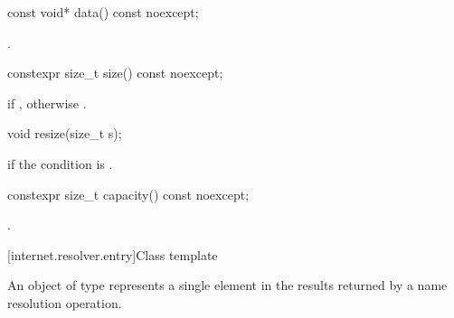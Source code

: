\begin{itemdecl}
const void* data() const noexcept;
\end{itemdecl}

\begin{itemdescr}
\pnum
\returns {}.
\end{itemdescr}

\begin{itemdecl}
constexpr size_t size() const noexcept;
\end{itemdecl}

\begin{itemdescr}
\pnum
\returns {} if , otherwise .
\end{itemdescr}

\begin{itemdecl}
void resize(size_t s);
\end{itemdecl}

\begin{itemdescr}
\pnum
\remarks {} if the condition  \tcode{||}  is .
\end{itemdescr}

\begin{itemdecl}
constexpr size_t capacity() const noexcept;
\end{itemdecl}

\begin{itemdescr}
\pnum
\returns {}.
\end{itemdescr}




%
[internet.resolver.entry]{Class template }

\pnum
An object of type  represents a single element in the results returned by a name resolution operation.

